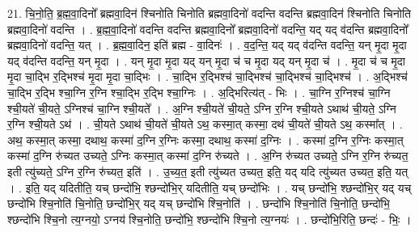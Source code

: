 \documentclass[17pt]{extarticle}
\begin{document}
21. चि॒नो॒ति॒ ब्र॒ह्म॒वा॒दिनो᳚ ब्रह्मवा॒दिन॑ श्चिनोति चिनोति ब्रह्मवा॒दिनो॑ वदन्ति वदन्ति ब्रह्मवा॒दिन॑ श्चिनोति चिनोति ब्रह्मवा॒दिनो॑ वदन्ति । . ब्र॒ह्म॒वा॒दिनो॑ वदन्ति वदन्ति ब्रह्मवा॒दिनो᳚ ब्रह्मवा॒दिनो॑ वदन्ति॒ यद् यद् व॑दन्ति ब्रह्मवा॒दिनो᳚ ब्रह्मवा॒दिनो॑ वदन्ति॒ यत् । . ब्र॒ह्म॒वा॒दिन॒ इति॑ ब्रह्म - वा॒दिनः॑ । . व॒द॒न्ति॒ यद् यद् व॑दन्ति वदन्ति॒ यन् मृ॒दा मृ॒दा यद् व॑दन्ति वदन्ति॒ यन् मृ॒दा । . यन् मृ॒दा मृ॒दा यद् यन् मृ॒दा च॑ च मृ॒दा यद् यन् मृ॒दा च॑ । . मृ॒दा च॑ च मृ॒दा मृ॒दा चा॒द्भि र॒द्भिश्च॑ मृ॒दा मृ॒दा चा॒द्भिः । . चा॒द्भि र॒द्भिश्च॑ चा॒द्भिश्च॑ चा॒द्भिश्च॑ चा॒द्भिश्च॑ । . अ॒द्भिश्च॑ चा॒द्भि र॒द्भि श्चा॒ग्नि र॒ग्नि श्चा॒द्भि र॒द्भि श्चा॒ग्निः । . अ॒द्भिरित्य॑त् - भिः । . चा॒ग्नि र॒ग्निश्च॑ चा॒ग्नि श्ची॒यते॑ ची॒यते॒ ऽग्निश्च॑ चा॒ग्नि श्ची॒यते᳚ । . अ॒ग्नि श्ची॒यते॑ ची॒यते॒ ऽग्नि र॒ग्नि श्ची॒यते ऽथाथ॑ ची॒यते॒ ऽग्नि र॒ग्नि श्ची॒यते ऽथ॑ । . ची॒यते ऽथाथ॑ ची॒यते॑ ची॒यते ऽथ॒ कस्मा॒त् कस्मा॒ दथ॑ ची॒यते॑ ची॒यते ऽथ॒ कस्मा᳚त् । . अथ॒ कस्मा॒त् कस्मा॒ दथाथ॒ कस्मा॑ द॒ग्नि र॒ग्निः कस्मा॒ दथाथ॒ कस्मा॑ द॒ग्निः । . कस्मा॑ द॒ग्नि र॒ग्निः कस्मा॒त् कस्मा॑ द॒ग्नि रु॑च्यत उच्यते॒ ऽग्निः कस्मा॒त् कस्मा॑ द॒ग्नि रु॑च्यते । . अ॒ग्नि रु॑च्यत उच्यते॒ ऽग्नि र॒ग्नि रु॑च्यत॒ इती त्यु॑च्यते॒ ऽग्नि र॒ग्नि रु॑च्यत॒ इति॑ । . उ॒च्य॒त॒ इती त्यु॑च्यत उच्यत॒ इति॒ यद् यदि त्यु॑च्यत उच्यत॒ इति॒ यत् । . इति॒ यद् यदितीति॒ यच् छन्दो॑भि॒ श्छन्दो॑भि॒र् यदितीति॒ यच् छन्दो॑भिः । . यच् छन्दो॑भि॒ श्छन्दो॑भि॒र् यद् यच् छन्दो॑भि श्चि॒नोति॑ चि॒नोति॒ छन्दो॑भि॒र् यद् यच् छन्दो॑भि श्चि॒नोति॑ । . छन्दो॑भि श्चि॒नोति॑ चि॒नोति॒ छन्दो॑भि॒ श्छन्दो॑भि श्चि॒नो त्य॒ग्नयो॒ ऽग्नय॑ श्चि॒नोति॒ छन्दो॑भि॒ श्छन्दो॑भि श्चि॒नो त्य॒ग्नयः॑ । . छन्दो॑भि॒रिति॒ छन्दः॑ - भिः॒ । \newline
\end{document}
